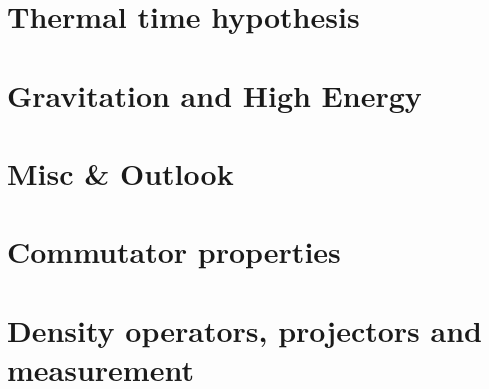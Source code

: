 \chapter{Thermal time hypothesis}


\chapter{Gravitation and High Energy}



\chapter{Misc \& Outlook}


\appendix
\chapter{Commutator properties}

\chapter{Density operators, projectors and measurement}


\printbibliography[heading=bibintoc]


